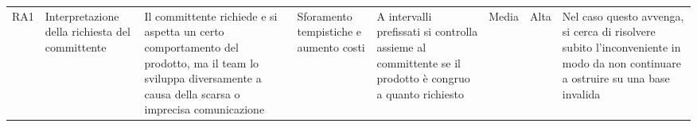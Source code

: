 \begin{landscape}
\begin{table}[h]
\begin{center}
\begin{tabular}{p{0.6cm}|p{1.8cm}|p{4cm}|p{2cm}|p{4cm}|p{0.9cm}|p{0.8cm}|p{4cm}}
RA1 & Interpretazione della richiesta del committente & Il committente richiede e si aspetta un certo comportamento del prodotto, ma il team lo sviluppa diversamente a causa della scarsa o imprecisa comunicazione & Sforamento tempistiche e aumento costi & A intervalli prefissati si controlla assieme al committente se il prodotto è congruo a quanto richiesto & Media & Alta & Nel caso questo avvenga, si cerca di risolvere subito l’inconveniente in modo da non continuare a ostruire su una base invalida \\
                                                                                                                                                                                                                                 
\end{tabular}
\end{center}
\end{table}
\end{landscape}
